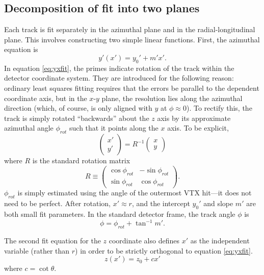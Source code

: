 \documentclass[12pt]{article}
\begin{document}
\subsection{Decomposition of fit into two planes} \label{sec:fitdecomp}
Each track is fit separately in the azimuthal plane and in the radial-longitudinal plane. This involves constructing two simple linear functions. First, the azimuthal equation is
\begin{equation} \label{eq:yxfit}
y'(x') = y_0' + m' x'.
\end{equation}
In equation \ref{eq:yxfit}, the primes indicate rotation of the track within the detector coordinate system. They are introduced for the following reason: ordinary least squares fitting requires that the errors be parallel to the dependent coordinate axis, but in the $x$-$y$ plane, the resolution lies along the azimuthal direction (which, of course, is only aligned with $y$ at $\phi \approx 0$). To rectify this, the track is simply rotated ``backwards'' about the $z$ axis by its approximate azimuthal angle $\phi_{rot}$ such that it points along the $x$ axis. To be explicit,
\begin{equation} \label{eq:phirot}
\begin{pmatrix}
x'\\
y'
\end{pmatrix}
= R^{-1}
\begin{pmatrix}
x\\
y
\end{pmatrix}
\end{equation}
where $R$ is the standard rotation matrix
\begin{equation} \label{eq:R}
R \equiv
\begin{pmatrix}
\cos \phi_{rot} & -\sin \phi_{rot}\\
\sin \phi_{rot} &  \cos \phi_{rot}
\end{pmatrix}.
\end{equation}
$\phi_{rot}$ is simply estimated using the angle of the outermost VTX hit---it does not need to be perfect. After rotation, $x' \approx r$, and the intercept $y_0'$ and slope $m'$ are both small fit parameters. In the standard detector frame, the track angle $\phi$ is
\begin{equation}
\phi = \phi_{rot} + \tan^{-1} m'.
\end{equation}

The second fit equation for the $z$ coordinate also defines $x'$ as the independent variable (rather than $r$) in order to be strictly orthogonal to equation \ref{eq:yxfit}.
\begin{equation} \label{eq:zrfit}
z(x') = z_0 + c x'
\end{equation}
where $c = \cot \theta$.
\end{document}
